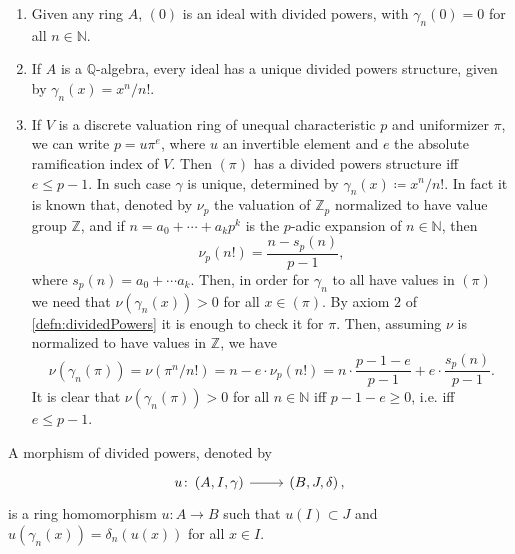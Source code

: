 \documentclass[../Main]{subfiles}
\begin{document}
\begin{ex}\leavevmode\vspace{-.2\baselineskip}
\begin{enumerate}
	\item Given any ring $A$, $(0)$ is an ideal with divided powers,
		with $\gamma_n(0) = 0$ for all $n \in \mathbb{N}$.

	\item If $A$ is a $\mathbb{Q}$-algebra, every ideal has a unique
		divided powers structure, given by $\gamma_n(x) = x^n/n!$.

	\item If $V$ is a discrete valuation ring of unequal characteristic $p$
		and uniformizer $\pi$, we can write $p = u \pi^e$,
		where $u$ an invertible element and $e$ the absolute ramification
		index of $V$.
		Then $\left( \pi \right)$ has a divided powers structure iff $e \leq p-1$.
		In such case $\gamma$ is unique, determined by
		$\gamma_n(x) \coloneqq x^n/n!$.
		In fact it is known that, denoted by $\nu_p$ the valuation
		of $\mathbb{Z}_{p}$ normalized to have value group $\mathbb{Z}$,
		and if $n = a_0 + \cdots + a_kp^k$ is the $p$-adic expansion
		of $n \in \mathbb{N}$, then
		\begin{equation*}
			\nu_p(n!) = 
			\frac{n - s_p(n)}{p-1}
		,\end{equation*}
		where $s_p(n) = a_0 + \cdots a_k$.
		Then, in order for $\gamma_n$ to all have values in $(\pi)$
		we need that $\nu(\gamma_n(x)) > 0$ for all $x \in (\pi)$.
		By axiom $2$ of \cref{defn:dividedPowers}
		it is enough to check it for $\pi$.
		Then, assuming $\nu$ is normalized to have values in $\mathbb{Z}$,
		we have
		\begin{equation*}
			\nu(\gamma_n(\pi)) = \nu(\pi^n/n!) =
			n - e \cdot \nu_p(n!) =
			n \cdot \frac{p - 1 - e}{p - 1} + e \cdot \frac{s_p(n)}{p - 1}
		.\end{equation*}
		It is clear that $\nu(\gamma_n(\pi)) > 0$ for all $n \in \mathbb{N}$
		iff $p - 1 - e \geq 0$, i.e. iff $e \leq p - 1$.
\end{enumerate}
\end{ex} 


\begin{defn}
	A morphism of divided powers, denoted by
	\begin{equation*}
	\begin{tikzcd}[row sep = 0ex
		,/tikz/column 1/.append style={anchor=base east}
		,/tikz/column 2/.append style={anchor=base west}]
		u\colon \left(A, I, \gamma\right) 
		\arrow[r, "", rightarrow] &
		\left(B, J, \delta\right)
	,\end{tikzcd}
	\end{equation*} 
	is a ring homomorphism $u\colon A \to B$ such that
	$u(I) \subset J$ and $u(\gamma_n(x)) = \delta_n(u(x))$
	for all $x \in I$.
\end{defn}
\end{document}
